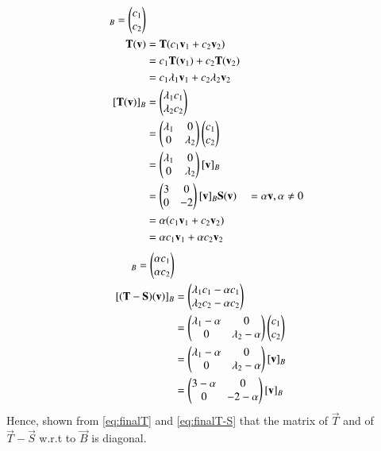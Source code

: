 \documentclass[journal,12pt]{IEEEtran}
\begin{document}
\begin{align}
    [\vec{v}]_B = \myvec{c_1 \\ c_2}\\
    \vec{T}(\vec{v}) & = \vec{T}(c_1\vec{v}_1 + c_2\vec{v}_2)\\& = c_1\vec{T}(\vec{v}_1) + c_2\vec{T}(\vec{v}_2)\\ & = c_1\lambda_1\vec{v}_1 + c_2\lambda_2\vec{v}_2\\
    [\vec{T}(\vec{v})]_B & = \myvec{\lambda_1 c_1\\ \lambda_2 c_2} \\&
    = \myvec{\lambda_1 & 0 \\ 0 & \lambda_2}\myvec{c_1 \\ c_2} \\&
    = \myvec{\lambda_1 & 0 \\ 0 & \lambda_2} [\vec{v}]_B \\& = \myvec{3 & 0\\0&-2}[\vec{v}]_B \label{eq:finalT}
    \vec{S}(\vec{v}) & = \alpha\vec{v}, \alpha \neq 0\\&
    = \alpha(c_1\vec{v}_1 + c_2\vec{v}_2)\\&
    = \alpha c_1\vec{v}_1 + \alpha c_2\vec{v}_2\\
\end{align}
\begin{align}
    [\vec{S}(\vec{v})]_B = \myvec{\alpha c_1\\ \alpha c_2}\\
    [(\vec{T}-\vec{S})(\vec{v})]_B & = \myvec{\lambda_1 c_1 -\alpha c_1 \\ \lambda_2 c_2 -\alpha c_2}\\ & = \myvec{\lambda_1 -\alpha & 0 \\ 0 & \lambda_2 - \alpha}\myvec{c_1 \\ c_2}\\ &
    = \myvec{\lambda_1 -\alpha & 0 \\ 0 & \lambda_2 - \alpha}[\vec{v}]_B \\ & = \myvec{3 -\alpha & 0 \\ 0 & -2 - \alpha}[\vec{v}]_B \label{eq:finalT-S}
\end{align}
Hence, shown from \eqref{eq:finalT} and \eqref{eq:finalT-S} that the matrix of $\vec{T}$ and of $\vec{T}-\vec{S}$ w.r.t to $\vec{B}$ is diagonal.
\end{document}
